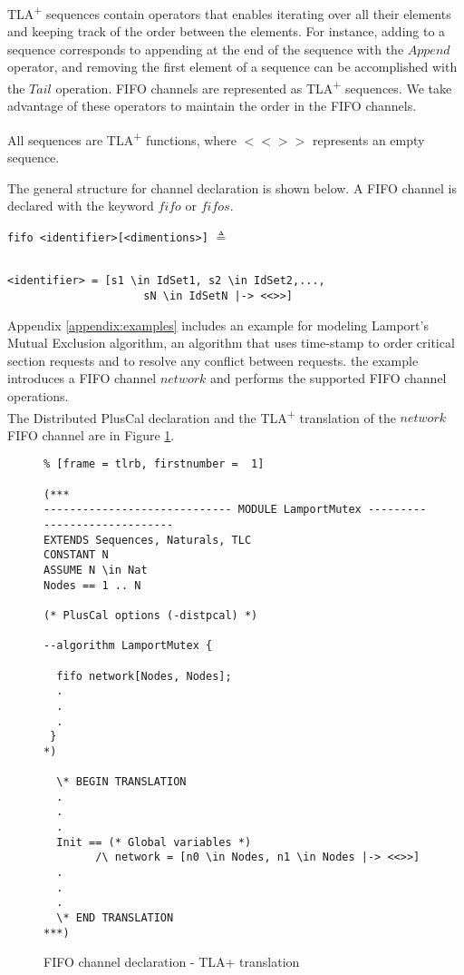 \documentclass{thesul}
\newcommand{\tlaplus}{TLA\textsuperscript{+}\xspace}
\begin{document}
\tlaplus sequences contain operators that enables iterating over all their elements and keeping track of the order between the elements. For instance, adding to a sequence corresponds to appending at the end of the sequence with the $Append$ operator, and removing the first element of a sequence can be accomplished with the $Tail$ operation. FIFO channels are represented as \tlaplus sequences. We take advantage of these operators to maintain the order in the FIFO channels.

All sequences are \tlaplus functions, where $<<>>$ represents an empty sequence.

The general structure for channel declaration is shown below. A FIFO channel is declared with the keyword $fifo$ or $fifos$. 

\begin{minipage}{.35\textwidth}

\lstinline|fifo <identifier>[<dimentions>]| $\triangleq$
\end{minipage}\hfill
\begin{minipage}{.65\textwidth}
\begin{lstlisting}[frame = none, numbers = none]

<identifier> = [s1 \in IdSet1, s2 \in IdSet2,...,
					 sN \in IdSetN |-> <<>>]
\end{lstlisting}

\end{minipage}\hfill


Appendix \ref{appendix:examples} includes an example for  modeling Lamport's Mutual Exclusion algorithm, an algorithm that uses time-stamp to order critical section requests and to resolve any conflict between requests. the example introduces a FIFO channel $network$ and performs the supported FIFO channel operations. \\

The Distributed PlusCal declaration and the \tlaplus translation of the $network$ FIFO channel are in Figure \ref{fifochannels}.

\FloatBarrier
\begin{figure}[!h]
\begin{lstlisting}% [frame = tlrb, firstnumber =  1]

(***
----------------------------- MODULE LamportMutex -----------------------------
EXTENDS Sequences, Naturals, TLC
CONSTANT N
ASSUME N \in Nat 
Nodes == 1 .. N

(* PlusCal options (-distpcal) *)
  
--algorithm LamportMutex { 

  fifo network[Nodes, Nodes];
  .
  .
  .
 }
*)
  
  \* BEGIN TRANSLATION 
  .
  .
  .
  Init == (* Global variables *)
        /\ network = [n0 \in Nodes, n1 \in Nodes |-> <<>>]
  .
  .
  .      
  \* END TRANSLATION 
***)

\end{lstlisting}
\caption{FIFO channel declaration - TLA+ translation}
\label{fifochannels}
\end{figure}
\FloatBarrier
\end{document}
